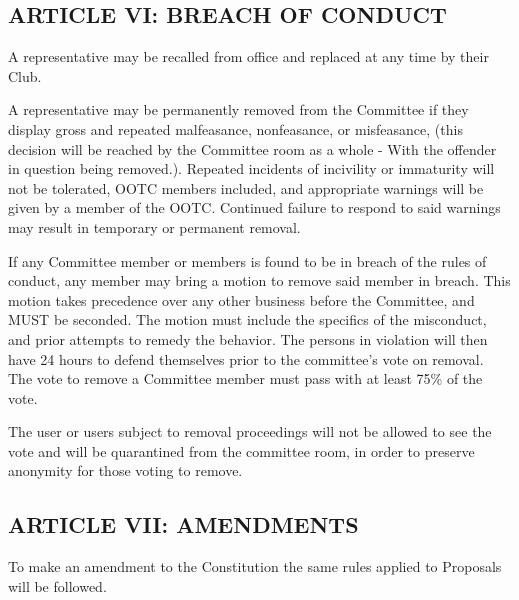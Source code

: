 \subsection{ARTICLE VI: BREACH OF CONDUCT}
\begin{deepEnumerate}
    \item A representative may be recalled from office and replaced at any time by their Club.
    \item A representative may be permanently removed from the Committee if they display gross and repeated malfeasance, nonfeasance, or misfeasance, 
    (this decision will be reached by the Committee room as a whole - With the offender in question being removed.). Repeated incidents of incivility or immaturity
     will not be tolerated, OOTC members included, and appropriate warnings will be given by a member of the OOTC. 
     Continued failure to respond to said warnings may result in temporary or permanent removal.
     \item If any Committee member or members is found to be in breach of the rules of conduct, any member may bring a motion to remove said member in breach. 
     This motion takes precedence over any other business before the Committee, and MUST be seconded. The motion must include the specifics of the misconduct, 
     and prior attempts to remedy the behavior. The persons in violation will then have 24 hours to defend themselves prior to the committee’s vote on removal. 
     The vote to remove a Committee member must pass with at least 75\% of the vote.
     \begin{deepEnumerate}
         \item The user or users subject to removal proceedings will not be allowed to see the vote and will be quarantined from the committee room, 
         in order to preserve anonymity for those voting to remove.
     \end{deepEnumerate}
\end{deepEnumerate}

\subsection{ARTICLE VII: AMENDMENTS}
\begin{deepEnumerate}
    \item To make an amendment to the Constitution the same rules applied to Proposals will be followed.
\end{deepEnumerate}

